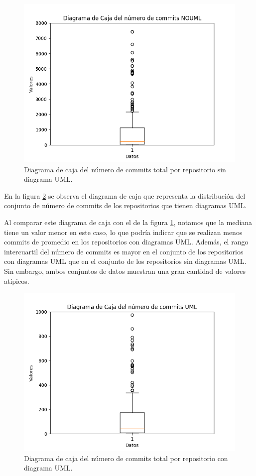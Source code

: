 \documentclass[a4paper, 12pt]{book}
\begin{document}
\begin{figure}
  \centering
  \includegraphics[width=12cm, keepaspectratio]{img/Figure_commitsNOUML.png}
  \caption{Diagrama de caja del número de commits total por repositorio sin diagrama UML. }\label{fig:Figure_commitsNOUML}
\end{figure}

En la figura \ref{fig:Figure_commitsUML} se observa el diagrama de caja que representa la distribución del conjunto de número de commits de los repositorios que tienen diagramas UML.


Al comparar este diagrama de caja con el de la figura \ref{fig:Figure_commitsNOUML}, notamos que la mediana tiene un valor menor en este caso, lo que podría indicar que se realizan menos commits de promedio en los repositorios con diagramas UML. 
Además, el rango intercuartil del número de commits es mayor en el conjunto de los repositorios con diagramas UML que en el conjunto de los repositorios sin diagramas UML.
Sin embargo, ambos conjuntos de datos muestran una gran cantidad de valores atípicos. 


\begin{figure}
  \centering
  \includegraphics[width=12cm, keepaspectratio]{img/Figure_commitsUML.png}
  \caption{Diagrama de caja del número de commits total por repositorio con diagrama UML.}\label{fig:Figure_commitsUML}
\end{figure}
\end{document}
